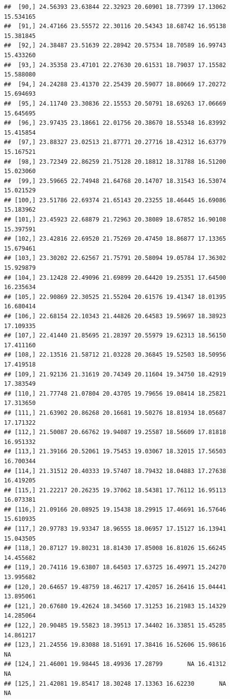 \documentclass{article}\usepackage[]{graphicx}\usepackage[]{color}
\makeatletter
\newenvironment{kframe}{%
 \def\at@end@of@kframe{}%
 \ifinner\ifhmode%
  \def\at@end@of@kframe{\end{minipage}}%
  \begin{minipage}{\columnwidth}%
 \fi\fi%
 \def\FrameCommand##1{\hskip\@totalleftmargin \hskip-\fboxsep
 \colorbox{shadecolor}{##1}\hskip-\fboxsep
     \hskip-\linewidth \hskip-\@totalleftmargin \hskip\columnwidth}%
 \MakeFramed {\advance\hsize-\width
   \@totalleftmargin\z@ \linewidth\hsize
   \@setminipage}}%
 {\par\unskip\endMakeFramed%
 \at@end@of@kframe}
\newenvironment{knitrout}{}{} %
\makeatother
\begin{document}
\begin{knitrout}
\begin{kframe}
\begin{verbatim}
##  [90,] 24.56393 23.63844 22.32923 20.60901 18.77399 17.13062 15.534165
##  [91,] 24.47166 23.55572 22.30116 20.54343 18.68742 16.95138 15.381845
##  [92,] 24.38487 23.51639 22.28942 20.57534 18.70589 16.99743 15.433260
##  [93,] 24.35358 23.47101 22.27630 20.61531 18.79037 17.15582 15.588080
##  [94,] 24.24288 23.41370 22.25439 20.59077 18.80669 17.20272 15.694693
##  [95,] 24.11740 23.30836 22.15553 20.50791 18.69263 17.06669 15.645695
##  [96,] 23.97435 23.18661 22.01756 20.38670 18.55348 16.83992 15.415854
##  [97,] 23.88327 23.02513 21.87771 20.27716 18.42312 16.63779 15.167521
##  [98,] 23.72349 22.86259 21.75128 20.18812 18.31788 16.51200 15.023060
##  [99,] 23.59665 22.74948 21.64768 20.14707 18.31543 16.53074 15.021529
## [100,] 23.51786 22.69374 21.65143 20.23255 18.46445 16.69086 15.183962
## [101,] 23.45923 22.68879 21.72963 20.38089 18.67852 16.90108 15.397591
## [102,] 23.42816 22.69520 21.75269 20.47450 18.86877 17.13365 15.679461
## [103,] 23.30202 22.62567 21.75791 20.58094 19.05784 17.36302 15.929879
## [104,] 23.12428 22.49096 21.69899 20.64420 19.25351 17.64500 16.235634
## [105,] 22.90869 22.30525 21.55204 20.61576 19.41347 18.01395 16.680414
## [106,] 22.68154 22.10343 21.44826 20.64583 19.59697 18.38923 17.109335
## [107,] 22.41440 21.85695 21.28397 20.55979 19.62313 18.56150 17.411160
## [108,] 22.13516 21.58712 21.03228 20.36845 19.52503 18.50956 17.419518
## [109,] 21.92136 21.31619 20.74349 20.11604 19.34750 18.42919 17.383549
## [110,] 21.77748 21.07804 20.43705 19.79656 19.08414 18.25821 17.313650
## [111,] 21.63902 20.86268 20.16681 19.50276 18.81934 18.05687 17.171322
## [112,] 21.50087 20.66762 19.94087 19.25587 18.56609 17.81818 16.951332
## [113,] 21.39166 20.52061 19.75453 19.03067 18.32015 17.56503 16.700344
## [114,] 21.31512 20.40333 19.57407 18.79432 18.04883 17.27638 16.419205
## [115,] 21.22217 20.26235 19.37062 18.54381 17.76112 16.95113 16.073381
## [116,] 21.09166 20.08925 19.15438 18.29915 17.46691 16.57646 15.610935
## [117,] 20.97783 19.93347 18.96555 18.06957 17.15127 16.13941 15.043505
## [118,] 20.87127 19.80231 18.81430 17.85008 16.81026 15.66245 14.455682
## [119,] 20.74116 19.63807 18.64503 17.63725 16.49971 15.24270 13.995682
## [120,] 20.64657 19.48759 18.46217 17.42057 16.26416 15.04441 13.895061
## [121,] 20.67680 19.42624 18.34560 17.31253 16.21983 15.14329 14.285064
## [122,] 20.90485 19.55823 18.39513 17.34402 16.33851 15.45285 14.861217
## [123,] 21.24556 19.83088 18.51691 17.38416 16.52606 15.98616        NA
## [124,] 21.46001 19.98445 18.49936 17.28799       NA 16.41312        NA
## [125,] 21.42081 19.85417 18.30248 17.13363 16.62230       NA        NA

\end{verbatim}
\end{kframe}
\end{knitrout}
\end{document}
